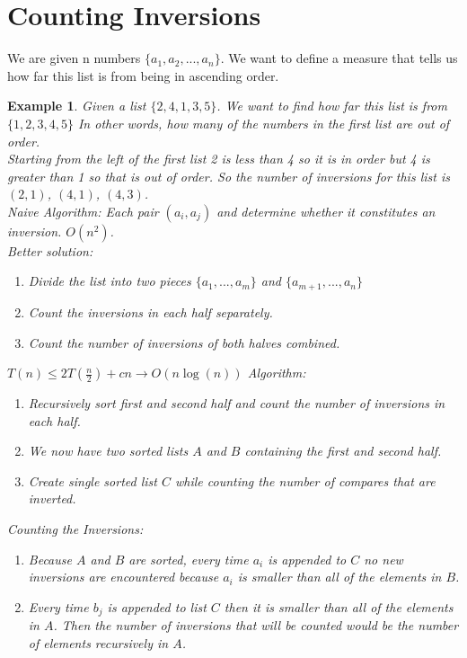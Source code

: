 \documentclass{report}
\newtheorem*{ex}{Example}
\newenvironment{problem}[2][Problem]{\begin{trivlist}
\item[\hskip \labelsep {\bfseries #1}\hskip \labelsep {\bfseries #2.}]}{\end{trivlist}}
\begin{document}
\section{Counting Inversions}
\begin{problem}\\
We are given n numbers $\{a_1,a_2,...,a_n\}$. We want to define a measure that tells us how far this list is from being in ascending order.
\end{problem}
\begin{ex}
Given a list $\{2,4,1,3,5\}$. We want to find how far this list is from $\{1,2,3,4,5\}$ In other words, how many of the numbers in the first list are out of order.\\
Starting from the left of the first list 2 is less than 4 so it is in order but 4 is greater than 1 so that is out of order. So the number of inversions for this list is $(2,1)$, $(4,1)$, $(4,3)$.\\
Naive Algorithm: Each pair $(a_i,a_j)$ and determine whether it constitutes an inversion. $O(n^2)$.\\
Better solution:
\begin{enumerate}
\item Divide the list into two pieces $\{a_1,...,a_m\}$ and $\{a_{m+1},...,a_n\}$
\item Count the inversions in each half separately.
\item Count the number of inversions of both halves combined.
\end{enumerate}
$T(n) \leq 2T(\frac{n}{2})+cn \rightarrow O(n\log(n))$
Algorithm:
\begin{enumerate}
\item Recursively sort first and second half and count the number of inversions in each half.
\item We now have two sorted lists $A$ and $B$ containing the first and second half.
\item Create single sorted list $C$ while counting the number of compares that are inverted.
\end{enumerate}
Counting the Inversions:
\begin{enumerate}
\item Because $A$ and $B$ are sorted, every time $a_i$ is appended to $C$ no new inversions are encountered because $a_i$ is smaller than all of the elements in $B$.
\item Every time $b_j$ is appended to list $C$ then it is smaller than all of the elements in $A$. Then the number of inversions that will be counted would be the number of elements recursively in $A$.

\end{enumerate}
\end{ex}
\end{document}
